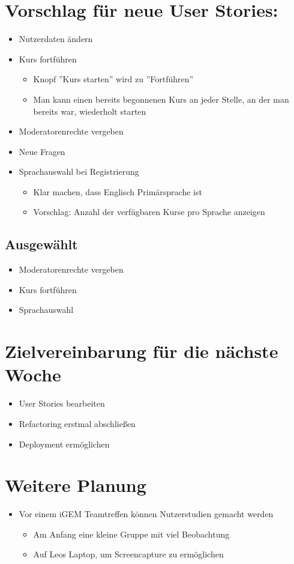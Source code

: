 \documentclass[colorback, accentcolor=tud1c, paper=a4]{tudexercise}
\begin{document}
\begin{multicols}{2}
\section{Vorschlag für neue User Stories:}
\begin{itemize}
\item Nutzerdaten ändern
\item Kurs fortführen
	\begin{itemize}
	\item Knopf ''Kurs starten'' wird zu ''Fortführen''
	\item Man kann einen bereits begonnenen Kurs an jeder Stelle, an der man bereits war, wiederholt starten
	\end{itemize}
\item Moderatorenrechte vergeben
\item Neue Fragen
\item Sprachauswahl bei Registrierung
	\begin{itemize}
	\item Klar machen, dass Englisch Primärsprache ist
	\item Vorschlag: Anzahl der verfügbaren Kurse pro Sprache anzeigen
	\end{itemize}
\end{itemize}

\subsection{Ausgewählt}
\begin{itemize}
\item Moderatorenrechte vergeben
\item Kurs fortführen
\item Sprachauswahl
\end{itemize}

\section{Zielvereinbarung für die nächste Woche}
\begin{itemize}
\item User Stories bearbeiten
\item Refactoring erstmal abschließen
\item Deployment ermöglichen
\end{itemize}

\section{Weitere Planung}
\begin{itemize}
\item Vor einem iGEM Teamtreffen können Nutzerstudien gemacht werden
	\begin{itemize}
	\item Am Anfang eine kleine Gruppe mit viel Beobachtung
	\item Auf Leos Laptop, um Screencapture zu ermöglichen
	\end{itemize}
\end{itemize}
\end{multicols}
\end{document}
